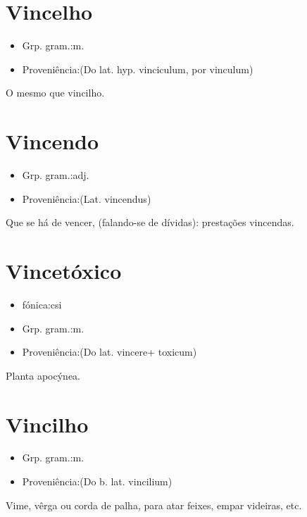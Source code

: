 \documentclass{article}
\begin{document}
\section{Vincelho}
\begin{itemize}
\item {Grp. gram.:m.}
\end{itemize}
\begin{itemize}
\item {Proveniência:(Do lat. hyp. \textunderscore vinciculum\textunderscore , por \textunderscore vinculum\textunderscore )}
\end{itemize}
O mesmo que \textunderscore vincilho\textunderscore .
\section{Vincendo}
\begin{itemize}
\item {Grp. gram.:adj.}
\end{itemize}
\begin{itemize}
\item {Proveniência:(Lat. \textunderscore vincendus\textunderscore )}
\end{itemize}
Que se há de vencer, (falando-se de dívidas): \textunderscore prestações vincendas\textunderscore .
\section{Vincetóxico}
\begin{itemize}
\item {fónica:csi}
\end{itemize}
\begin{itemize}
\item {Grp. gram.:m.}
\end{itemize}
\begin{itemize}
\item {Proveniência:(Do lat. \textunderscore vincere\textunderscore  + \textunderscore toxicum\textunderscore )}
\end{itemize}
Planta apocýnea.
\section{Vincilho}
\begin{itemize}
\item {Grp. gram.:m.}
\end{itemize}
\begin{itemize}
\item {Proveniência:(Do b. lat. \textunderscore vincilium\textunderscore )}
\end{itemize}
Vime, vêrga ou corda de palha, para atar feixes, empar videiras, etc.
\end{document}
